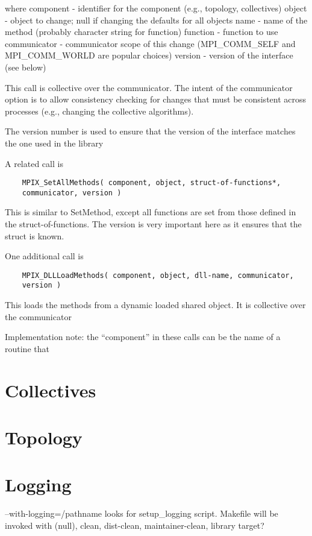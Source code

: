 \documentclass{report}
\begin{document}
where
    component - identifier for the component (e.g., topology,
    collectives)
    object    - object to change; null if changing the defaults for
    all objects
    name      - name of the method (probably character string for function)
    function  - function to use
    communicator - communicator scope of this change (MPI\_COMM\_SELF
    and MPI\_COMM\_WORLD are popular choices)
    version   - version of the interface (see below)

    This call is collective over the communicator.  The intent of the 
    communicator option is to allow consistency checking for changes
    that must be consistent across processes (e.g., changing the
    collective algorithms).

    The version number is used to ensure that the version of the
    interface matches the one used in the library

A related call is

\begin{verbatim}
    MPIX_SetAllMethods( component, object, struct-of-functions*,
    communicator, version )
\end{verbatim}

This is similar to SetMethod, except all functions are set from those
defined in the struct-of-functions.  The version is very important
here as it ensures that the struct is known.

One additional call is

\begin{verbatim}
    MPIX_DLLLoadMethods( component, object, dll-name, communicator,
    version )
\end{verbatim}

This loads the methods from a dynamic loaded shared object.  It is
collective over the communicator

Implementation note: the ``component'' in these calls can be the name
of a routine that 

\section{Collectives}
\section{Topology}
\section{Logging}
    --with-logging=/pathname
    looks for setup\_logging script.  Makefile will be invoked with (null),
    clean, dist-clean, maintainer-clean, library target?
\end{document}
